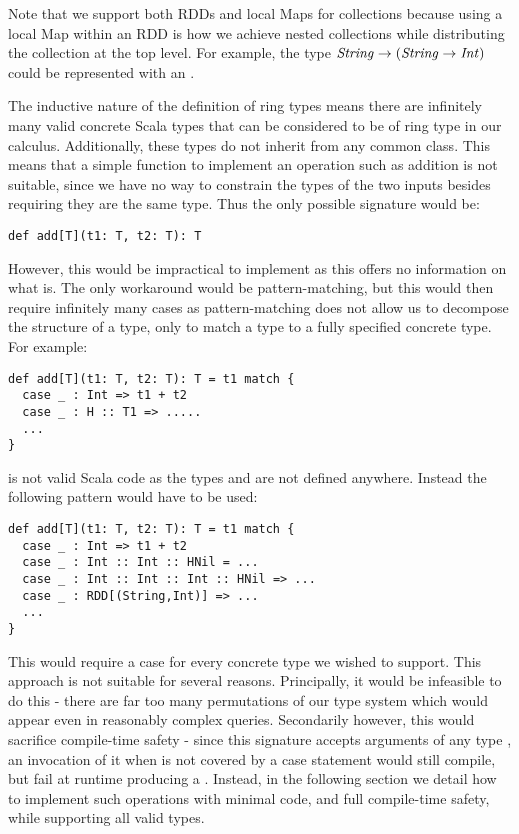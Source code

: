 Note that we support both RDDs and local Maps for collections because using a local Map within an RDD is how we achieve nested collections while distributing the collection at the top level. For example, the type $\textrm{\textit{String}} \rightarrow (\textrm{\textit{String}} \rightarrow \textrm{\textit{Int}})$ could be represented with an .

\vs The inductive nature of the definition of ring types means there are infinitely many valid concrete Scala types that can be considered to be of ring type in our calculus. Additionally, these types do not inherit from any common class. This means that a simple function to implement an operation such as addition is not suitable, since we have no way to constrain the types of the two inputs besides requiring they are the same type. Thus the only possible signature would be:
\vs\begin{lstlisting}
def add[T](t1: T, t2: T): T
\end{lstlisting}\vs
However, this would be impractical to implement as this offers no information on what  is. The only workaround would be pattern-matching, but this would then require infinitely many cases as pattern-matching does not allow us to decompose the structure of a type, only to match a type to a fully specified concrete type. For example:
\vs\begin{lstlisting}
def add[T](t1: T, t2: T): T = t1 match {
  case _ : Int => t1 + t2
  case _ : H :: T1 => .....
  ...
}
\end{lstlisting}\vs
is not valid Scala code as the types  and  are not defined anywhere. Instead the following pattern would have to be used:
\vs\begin{lstlisting}
def add[T](t1: T, t2: T): T = t1 match {
  case _ : Int => t1 + t2
  case _ : Int :: Int :: HNil = ...
  case _ : Int :: Int :: Int :: HNil => ...
  case _ : RDD[(String,Int)] => ...
  ...
}
\end{lstlisting}\vs
This would require a case for every concrete type we wished to support. This approach is not suitable for several reasons. Principally, it would be infeasible to do this - there are far too many permutations of our type system which would appear even in reasonably complex queries. Secondarily however, this would sacrifice compile-time safety - since this signature accepts arguments of any type , an invocation of it when  is not covered by a case statement would still compile, but fail at runtime producing a . Instead, in the following section we detail how to implement such operations with minimal code, and full compile-time safety, while supporting all valid types.


